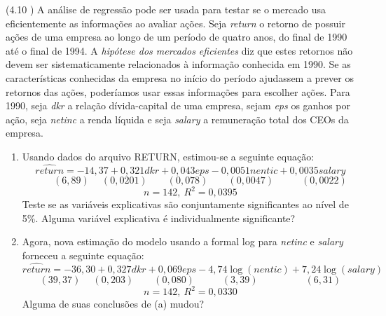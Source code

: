 \documentclass[12pt,letterpaper, onecolumn]{exam}
\begin{document}
\begin{questions}
\question\qstar (4.10 \citep{wooldridge2016}) A análise de regressão pode ser usada para testar se o mercado usa eficientemente as informações ao avaliar ações. Seja \textit{return} o retorno de possuir ações de uma empresa ao longo de um período de quatro anos, do final de 1990 até o final de 1994. A \textit{hipótese dos mercados eficientes} diz que estes retornos não devem ser sistematicamente relacionados à informação conhecida em 1990. Se as características conhecidas da empresa no início do período ajudassem a prever os retornos das ações, poderíamos usar essas informações para escolher ações.
Para 1990, seja \textit{dkr} a relação dívida-capital de uma empresa, sejam \textit{eps} os ganhos por ação, seja \textit{netinc} a renda líquida e seja \textit{salary} a remuneração total dos CEOs da empresa.
\begin{enumerate}[label = (\alph*)]
    \item Usando dados do arquivo RETURN, estimou-se a seguinte equação:
    \begin{equation*}
        \widehat{return} = -14,37 + 0,321dkr + 0,043eps - 0,0051nentic + 0,0035 salary
    \end{equation*}\vspace{-2em}\begin{equation*}
        \phantom{--} (6,89) \phantom{-}(0,0201) \phantom{--} (0,078) \phantom{--} (0,0047) \phantom{---} (0,0022)
    \end{equation*}\begin{equation*}
        n = 142, \ R^2 = 0,0395
    \end{equation*} Teste se as variáveis explicativas são conjuntamente significantes ao nível de 5\%. Alguma variável explicativa é individualmente significante?
    \item Agora, nova estimação do modelo usando a formal log para \textit{netinc} e \textit{salary} forneceu a seguinte equação:    \begin{equation*}
        \widehat{return} = -36,30 + 0,327dkr + 0,069eps - 4,74\log(nentic) + 7,24 \log(salary)
    \end{equation*}\vspace{-2em}\begin{equation*}
        \phantom{} (39,37) \phantom{-}(0,203) \phantom{--} (0,080) \phantom{---} (3,39) \phantom{-----} (6,31)
    \end{equation*}\begin{equation*}
        n = 142, \ R^2 = 0,0330
    \end{equation*}Alguma de suas conclusões de (a) mudou?

\end{enumerate}
\end{questions}
\end{document}
